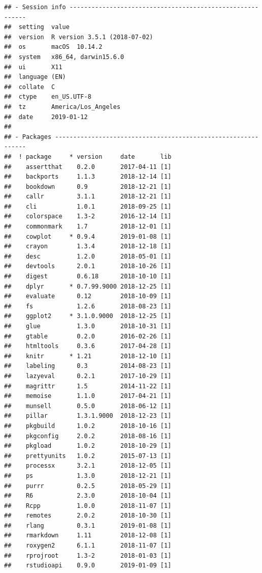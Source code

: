 \documentclass[]{elsarticle} %
\begin{document}
\begin{verbatim}
## - Session info ----------------------------------------------------------
##  setting  value                       
##  version  R version 3.5.1 (2018-07-02)
##  os       macOS  10.14.2              
##  system   x86_64, darwin15.6.0        
##  ui       X11                         
##  language (EN)                        
##  collate  C                           
##  ctype    en_US.UTF-8                 
##  tz       America/Los_Angeles         
##  date     2019-01-12                  
## 
## - Packages --------------------------------------------------------------
##  ! package     * version     date       lib
##    assertthat    0.2.0       2017-04-11 [1]
##    backports     1.1.3       2018-12-14 [1]
##    bookdown      0.9         2018-12-21 [1]
##    callr         3.1.1       2018-12-21 [1]
##    cli           1.0.1       2018-09-25 [1]
##    colorspace    1.3-2       2016-12-14 [1]
##    commonmark    1.7         2018-12-01 [1]
##    cowplot     * 0.9.4       2019-01-08 [1]
##    crayon        1.3.4       2018-12-18 [1]
##    desc          1.2.0       2018-05-01 [1]
##    devtools      2.0.1       2018-10-26 [1]
##    digest        0.6.18      2018-10-10 [1]
##    dplyr       * 0.7.99.9000 2018-12-25 [1]
##    evaluate      0.12        2018-10-09 [1]
##    fs            1.2.6       2018-08-23 [1]
##    ggplot2     * 3.1.0.9000  2018-12-25 [1]
##    glue          1.3.0       2018-10-31 [1]
##    gtable        0.2.0       2016-02-26 [1]
##    htmltools     0.3.6       2017-04-28 [1]
##    knitr       * 1.21        2018-12-10 [1]
##    labeling      0.3         2014-08-23 [1]
##    lazyeval      0.2.1       2017-10-29 [1]
##    magrittr      1.5         2014-11-22 [1]
##    memoise       1.1.0       2017-04-21 [1]
##    munsell       0.5.0       2018-06-12 [1]
##    pillar        1.3.1.9000  2018-12-23 [1]
##    pkgbuild      1.0.2       2018-10-16 [1]
##    pkgconfig     2.0.2       2018-08-16 [1]
##    pkgload       1.0.2       2018-10-29 [1]
##    prettyunits   1.0.2       2015-07-13 [1]
##    processx      3.2.1       2018-12-05 [1]
##    ps            1.3.0       2018-12-21 [1]
##    purrr         0.2.5       2018-05-29 [1]
##    R6            2.3.0       2018-10-04 [1]
##    Rcpp          1.0.0       2018-11-07 [1]
##    remotes       2.0.2       2018-10-30 [1]
##    rlang         0.3.1       2019-01-08 [1]
##    rmarkdown     1.11        2018-12-08 [1]
##    roxygen2      6.1.1       2018-11-07 [1]
##    rprojroot     1.3-2       2018-01-03 [1]
##    rstudioapi    0.9.0       2019-01-09 [1]

\end{verbatim}
\end{document}
